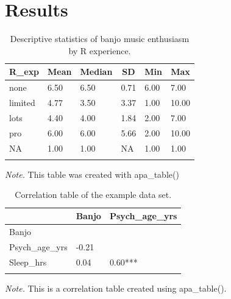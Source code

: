 \documentclass[english,man]{apa6}
\theoremstyle{definition}
\theoremstyle{definition}
\theoremstyle{definition}
\theoremstyle{remark}
\begin{document}
\section{Results}\label{results}

\begin{table}[tbp]
\begin{center}
\begin{threeparttable}
\caption{\label{tab:Banjo-by-experience}Descriptive statistics of banjo music enthusiasm by R experience.}
\begin{tabular}{llllll}
\toprule
R\_exp & \multicolumn{1}{c}{Mean} & \multicolumn{1}{c}{Median} & \multicolumn{1}{c}{SD} & \multicolumn{1}{c}{Min} & \multicolumn{1}{c}{Max}\\
\midrule
none & 6.50 & 6.50 & 0.71 & 6.00 & 7.00\\
limited & 4.77 & 3.50 & 3.37 & 1.00 & 10.00\\
lots & 4.40 & 4.00 & 1.84 & 2.00 & 7.00\\
pro & 6.00 & 6.00 & 5.66 & 2.00 & 10.00\\
NA & 1.00 & 1.00 & NA & 1.00 & 1.00\\
\bottomrule
\addlinespace
\end{tabular}
\begin{tablenotes}[para]
\textit{Note.} This table was created with apa\_table()
\end{tablenotes}
\end{threeparttable}
\end{center}
\end{table}

\begin{table}[tbp]
\begin{center}
\begin{threeparttable}
\caption{\label{tab:apa-corr-table}Correlation table of the example data set.}
\begin{tabular}{lll}
\toprule
 & \multicolumn{1}{c}{Banjo} & \multicolumn{1}{c}{Psych\_age\_yrs}\\
\midrule
Banjo &  & \\
Psych\_age\_yrs & -0.21 & \\
Sleep\_hrs & 0.04 & 0.60***\\
\bottomrule
\addlinespace
\end{tabular}
\begin{tablenotes}[para]
\textit{Note.} This is a correlation table created using apa\_table().
\end{tablenotes}
\end{threeparttable}
\end{center}
\end{table}
\end{document}
